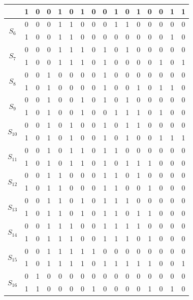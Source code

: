 \begin{table}[H]
\begin{tabular}{|c|c|c|c|c|c|c|c|c|c|c|c|c|c|c|c|}
 & 1 & 0 & 0 & 1 & 0 & 1 & 0 & 0 & 1 & 0 & 1 & 0 & 0 & 1 & 1 \\
\hline
\multirow{2}{*}{$S_6$} & 0 & 0 & 0 & 1 & 1 & 0 & 0 & 0 & 1 & 1 & 0 & 0 & 0 & 0 & 0 \\
\cline{2-16}
 & 1 & 0 & 0 & 1 & 1 & 0 & 0 & 0 & 0 & 0 & 0 & 0 & 0 & 1 & 0 \\
\hline
\multirow{2}{*}{$S_7$} & 0 & 0 & 0 & 1 & 1 & 1 & 0 & 1 & 0 & 1 & 0 & 0 & 0 & 0 & 0 \\
\cline{2-16}
 & 1 & 0 & 0 & 1 & 1 & 1 & 0 & 1 & 0 & 0 & 0 & 0 & 1 & 0 & 1 \\
\hline
\multirow{2}{*}{$S_8$} & 0 & 0 & 1 & 0 & 0 & 0 & 0 & 1 & 0 & 0 & 0 & 0 & 0 & 0 & 0 \\
\cline{2-16}
 & 1 & 0 & 1 & 0 & 0 & 0 & 0 & 1 & 0 & 0 & 1 & 0 & 1 & 1 & 0 \\
\hline
\multirow{2}{*}{$S_9$} & 0 & 0 & 1 & 0 & 0 & 1 & 0 & 1 & 0 & 1 & 0 & 0 & 0 & 0 & 0 \\
\cline{2-16}
 & 1 & 0 & 1 & 0 & 0 & 1 & 0 & 0 & 1 & 1 & 1 & 0 & 1 & 0 & 0 \\
\hline
\multirow{2}{*}{$S_{10}$} & 0 & 0 & 1 & 0 & 1 & 0 & 0 & 1 & 0 & 1 & 1 & 0 & 0 & 0 & 0 \\
\cline{2-16}
 & 1 & 0 & 1 & 0 & 1 & 0 & 0 & 1 & 0 & 1 & 0 & 0 & 1 & 1 & 1 \\
\hline
\multirow{2}{*}{$S_{11}$} & 0 & 0 & 1 & 0 & 1 & 1 & 0 & 1 & 1 & 0 & 0 & 0 & 0 & 0 & 0 \\
\cline{2-16}
 & 1 & 0 & 1 & 0 & 1 & 1 & 0 & 1 & 0 & 1 & 1 & 1 & 0 & 0 & 0 \\
\hline
\multirow{2}{*}{$S_{12}$} & 0 & 0 & 1 & 1 & 0 & 0 & 0 & 1 & 1 & 0 & 1 & 0 & 0 & 0 & 0 \\
\cline{2-16}
 & 1 & 0 & 1 & 1 & 0 & 0 & 0 & 1 & 1 & 0 & 0 & 1 & 0 & 0 & 0 \\
\hline
\multirow{2}{*}{$S_{13}$} & 0 & 0 & 1 & 1 & 0 & 1 & 0 & 1 & 1 & 1 & 0 & 0 & 0 & 0 & 0 \\
\cline{2-16}
 & 1 & 0 & 1 & 1 & 0 & 1 & 0 & 1 & 1 & 0 & 1 & 1 & 0 & 0 & 0 \\
\hline
\multirow{2}{*}{$S_{14}$} & 0 & 0 & 1 & 1 & 1 & 0 & 0 & 1 & 1 & 1 & 1 & 0 & 0 & 0 & 0 \\
\cline{2-16}
 & 1 & 0 & 1 & 1 & 1 & 0 & 0 & 1 & 1 & 1 & 0 & 1 & 0 & 0 & 0 \\
\hline
\multirow{2}{*}{$S_{15}$} & 0 & 0 & 1 & 1 & 1 & 1 & 1 & 0 & 0 & 0 & 0 & 0 & 0 & 0 & 0 \\
\cline{2-16}
 & 1 & 0 & 1 & 1 & 1 & 1 & 0 & 1 & 1 & 1 & 1 & 1 & 0 & 0 & 1 \\
\hline
\multirow{2}{*}{$S_{16}$} & 0 & 1 & 0 & 0 & 0 & 0 & 0 & 0 & 0 & 0 & 0 & 0 & 0 & 0 & 0 \\
\cline{2-16}
 & 1 & 1 & 0 & 0 & 0 & 0 & 1 & 0 & 0 & 0 & 0 & 1 & 0 & 1 & 0 \\
\hline
\end{tabular}
\end{table}

